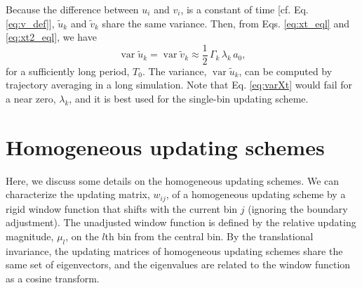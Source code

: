 \documentclass[reprint, superscriptaddress, floatfix]{revtex4-1}
\begin{document}
Because the difference between $u_i$ and $v_i$,
is a constant of time [cf. Eq. \eqref{eq:v_def}],
${\tilde u}_{k}$ and ${\tilde v}_{k}$
share the same variance.
%
%
Then, from Eqs. \eqref{eq:xt_eql} and \eqref{eq:xt2_eql}, we have
%
\begin{equation}
  \operatorname{var} {\tilde u}_k
  =
  \operatorname{var} {\tilde v}_{k}
  \approx
  \frac{1}{2} \, \Gamma_k \, \lambda_k \, a_0
  ,
\label{eq:varXt}
\end{equation}
%
for a sufficiently long period, $T_0$.
%
The variance, $\operatorname{var} \tilde u_k$, can be computed
by trajectory averaging in a long simulation.
%
Note that Eq. \eqref{eq:varXt} would fail for a near zero, $\lambda_k$,
and it is best used for the single-bin updating scheme.%






\section{\label{sec:homo}
Homogeneous updating schemes
}


Here, we discuss some details
on the homogeneous updating schemes.
%
We can characterize
the updating matrix, $w_{ij}$,
of a homogeneous updating scheme
by a rigid window function
that shifts with the current bin $j$
(ignoring the boundary adjustment).
%
The unadjusted window function is defined by
the relative updating magnitude, $\mu_l$,
on the $l$th bin from the central bin.
%
%
By the translational invariance,
the updating matrices of homogeneous updating schemes
share the same set of eigenvectors,
and the eigenvalues
are related to the window function as a cosine transform.
\end{document}
